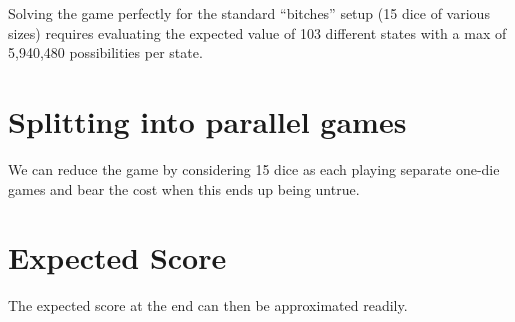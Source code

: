 \documentclass[11pt, oneside]{article} 	%
\begin{document}
Solving the game perfectly for the standard ``bitches'' setup (15 dice of various sizes) requires evaluating the expected value of 103 different states with a max of 5,940,480 possibilities per state. 

\section{Splitting into parallel games} \label{section:split-out}

We can reduce the game by considering 15 dice as each playing separate one-die games and bear the cost when this ends up being untrue.

\section{Expected Score} \label {section:final-ev} 
The expected score at the end can then be approximated readily.
\end{document}
